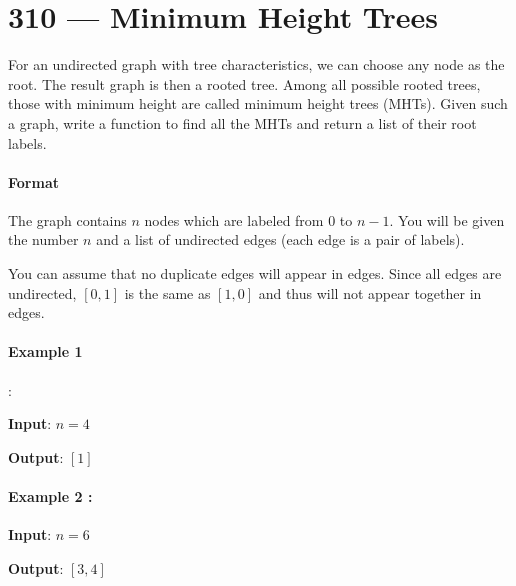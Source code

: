 \section{310 --- Minimum Height Trees}
For an undirected graph with tree characteristics, we can choose any node as the root. The result graph is then a rooted tree. Among all possible rooted trees, those with minimum height are called minimum height trees (MHTs). Given such a graph, write a function to find all the MHTs and return a list of their root labels.

\paragraph{Format}
\par
The graph contains $ n $ nodes which are labeled from 0 to $  n - 1 $. You will be given the number $ n $ and a list of undirected edges (each edge is a pair of labels).
\par
You can assume that no duplicate edges will appear in edges. Since all edges are undirected, $ [0, 1] $ is the same as $ [1, 0] $ and thus will not appear together in edges.

\paragraph{Example 1}:

\begin{flushleft}
\textbf{Input}: $ n = 4 $
\begin{figure}[H]
\end{figure}
\textbf{Output}: $ [1] $
\end{flushleft}

\paragraph{Example 2 :}

\begin{flushleft}
\textbf{Input}: $ n = 6 $
\begin{figure}[H]
\end{figure}
\textbf{Output}: $ [3, 4] $
\end{flushleft}

